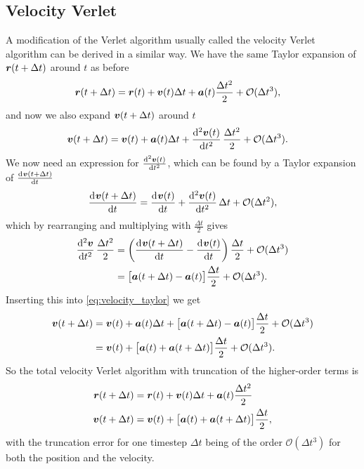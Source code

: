 \subsection{Velocity Verlet}
A modification of the Verlet algorithm usually called the velocity Verlet algorithm\cite{swope1982computer}  can be derived in a similar way. We have the same Taylor expansion of $\boldsymbol{r}(t+\Delta t)$ around $t$ as before
\begin{align}
    \boldsymbol{r}(t + \Delta t) &= \boldsymbol{r}(t) + \boldsymbol{v}(t)\Delta t + \boldsymbol{a}(t)\frac{\Delta t^2}{2} + \mathcal{O}(\Delta t^3), \label{eq:position_taylor}
\end{align}
and now we also expand $\boldsymbol{v}(t + \Delta t)$ around $t$
\begin{align}
    \vvec(t + \Delta t) 
    &= \vvec(t) + \avec(t)\Delta t + \dod[2]{\vvec(t)}{t}\frac{\Delta t^2}{2} + \mathcal{O}(\Delta t^3). \label{eq:velocity_taylor}
\end{align}
We now need an expression for $\od[2]{\vvec(t)}{t}$, which can be found by a Taylor expansion of $\od{\vvec(t+\Delta t)}{t}$
\begin{align*}
    \dod{\vvec(t+\Delta t)}{t} = \dod{\vvec(t)}{t} + \dod[2]{\vvec(t)}{t}\Delta t + \mathcal{O}(\Delta t^2),
\end{align*}
which by rearranging and multiplying with $\frac{\Delta t}{2}$ gives
\begin{align*}
    \dod[2]{\vvec}{t}\frac{\Delta t^2}{2} 
    &= \left( \dod{\vvec(t+\Delta t)}{t} - \dod{\vvec(t)}{t}\right)\frac{\Delta t}{2} + \mathcal{O}(\Delta t^3) \\
    &= \big[\avec(t + \Delta t) - \avec(t)\big] \frac{\Delta t}{2} + \mathcal{O}(\Delta t^3).
\end{align*}
Inserting this into \cref{eq:velocity_taylor} we get
\begin{align}
    \boldsymbol{v}(t + \Delta t) 
    &= \boldsymbol{v}(t) + \boldsymbol{a}(t)\Delta t + \big[\boldsymbol{a}(t + \Delta t) - \boldsymbol{a}(t)\big] \frac{\Delta t}{2} + \mathcal{O}(\Delta t^3) \nonumber\\
    &= \boldsymbol{v}(t) + \big[\boldsymbol{a}(t) + \boldsymbol{a}(t + \Delta t)\big] \frac{\Delta t}{2} + \mathcal{O}(\Delta t^3). \label{eq:verlet_velocity_taylor_insertion}
\end{align}
So the total velocity Verlet algorithm with truncation of the higher-order terms is
\begin{align}
    \rvec(t + \Delta t) &= \rvec(t) + \vvec(t)\Delta t + \avec(t)\frac{\Delta t^2}{2} %
    \\
    \vvec(t + \Delta t) &= \vvec(t) + \big[\avec(t) + \avec(t + \Delta t)\big] \frac{\Delta t}{2}, %
\end{align}
with the truncation error for one timestep $\Delta t$ being of the order $\mathcal{O}(\Delta t^3)$ for both the position and the velocity. 

